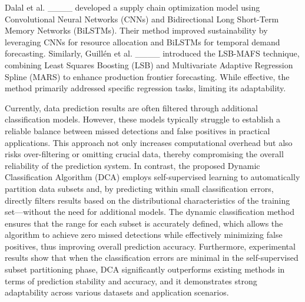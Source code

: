Dalal et al. ____ developed a supply chain optimization model using Convolutional Neural Networks (CNNs) and Bidirectional Long Short-Term Memory Networks (BiLSTMs). Their method improved sustainability by leveraging CNNs for resource allocation and BiLSTMs for temporal demand forecasting. Similarly, Guillén et al. ____ introduced the LSB-MAFS technique, combining Least Squares Boosting (LSB) and Multivariate Adaptive Regression Spline (MARS) to enhance production frontier forecasting. While effective, the method primarily addressed specific regression tasks, limiting its adaptability.

Currently, data prediction results are often filtered through additional classification models. However, these models typically struggle to establish a reliable balance between missed detections and false positives in practical applications. This approach not only increases computational overhead but also risks over-filtering or omitting crucial data, thereby compromising the overall reliability of the prediction system. In contrast, the proposed Dynamic Classification Algorithm (DCA) employs self-supervised learning to automatically partition data subsets and, by predicting within small classification errors, directly filters results based on the distributional characteristics of the training set—without the need for additional models. The dynamic classification method ensures that the range for each subset is accurately defined, which allows the algorithm to achieve zero missed detections while effectively minimizing false positives, thus improving overall prediction accuracy. Furthermore, experimental results show that when the classification errors are minimal in the self-supervised subset partitioning phase, DCA significantly outperforms existing methods in terms of prediction stability and accuracy, and it demonstrates strong adaptability across various datasets and application scenarios.